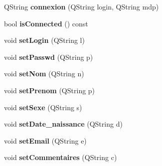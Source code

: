 \begin{DoxyCompactItemize}
\item 
\hypertarget{class_connexion_a2475dca7bbaf306d42b2e78f2f0cf08d}{Q\+String {\bfseries connexion} (Q\+String login, Q\+String mdp)}\label{class_connexion_a2475dca7bbaf306d42b2e78f2f0cf08d}

\item 
\hypertarget{class_connexion_a1df48b898953e64849a8a541be1f7aee}{bool {\bfseries is\+Connected} () const }\label{class_connexion_a1df48b898953e64849a8a541be1f7aee}

\item 
\hypertarget{class_connexion_a711ba0ec90937364ae8ff7067d68ac28}{void {\bfseries set\+Login} (Q\+String l)}\label{class_connexion_a711ba0ec90937364ae8ff7067d68ac28}

\item 
\hypertarget{class_connexion_a3fde06cd178af385b07438aac86c61b3}{void {\bfseries set\+Passwd} (Q\+String p)}\label{class_connexion_a3fde06cd178af385b07438aac86c61b3}

\item 
\hypertarget{class_connexion_a88ef41db366132d1cd48387b4806e03f}{void {\bfseries set\+Nom} (Q\+String n)}\label{class_connexion_a88ef41db366132d1cd48387b4806e03f}

\item 
\hypertarget{class_connexion_a4ec36b38a59d38b1bfee2933a5379d2d}{void {\bfseries set\+Prenom} (Q\+String p)}\label{class_connexion_a4ec36b38a59d38b1bfee2933a5379d2d}

\item 
\hypertarget{class_connexion_a17e79c1d04b1e5d5d18b9ccded6778b3}{void {\bfseries set\+Sexe} (Q\+String s)}\label{class_connexion_a17e79c1d04b1e5d5d18b9ccded6778b3}

\item 
\hypertarget{class_connexion_a0437b302f989a63e5e0fae37b26cbdcd}{void {\bfseries set\+Date\+\_\+naissance} (Q\+String d)}\label{class_connexion_a0437b302f989a63e5e0fae37b26cbdcd}

\item 
\hypertarget{class_connexion_a714db9bc9a522e4778fddad78b30c115}{void {\bfseries set\+Email} (Q\+String e)}\label{class_connexion_a714db9bc9a522e4778fddad78b30c115}

\item 
\hypertarget{class_connexion_a24889880f5ce6cc8b64318882486e7e1}{void {\bfseries set\+Commentaires} (Q\+String c)}\label{class_connexion_a24889880f5ce6cc8b64318882486e7e1}


\end{DoxyCompactItemize}
